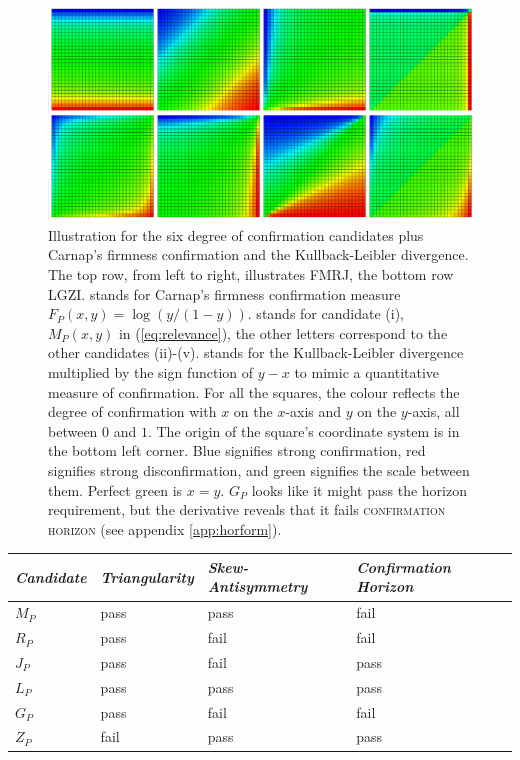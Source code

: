 \documentclass[phd,12pt,oneside]{ubcthesis}
\begin{document}
\begin{figure}[ht!]
    \begin{minipage}[h]{\linewidth}
      \includegraphics[width=\textwidth]{confirmation-FMRJLGZI.png}
      \caption{\footnotesize Illustration for the six degree of
        confirmation candidates plus Carnap's firmness confirmation
        and the Kullback-Leibler divergence. The top row, from left to
        right, illustrates FMRJ, the bottom row LGZI.  stands
        for Carnap's firmness confirmation measure
        $F_{P}(x,y)=\log(y/(1-y))$.  stands for candidate
        (i), $M_{P}(x,y)$ in (\ref{eq:relevance}), the other letters
        correspond to the other candidates (ii)-(v).  stands
        for the Kullback-Leibler divergence multiplied by the sign
        function of $y-x$ to mimic a quantitative measure of
        confirmation. For all the squares, the colour reflects the
        degree of confirmation with $x$ on the $x$-axis and $y$ on the
        $y$-axis, all between $0$ and $1$. The origin of the square's
        coordinate system is in the bottom left corner. Blue signifies
        strong confirmation, red signifies strong disconfirmation, and
        green signifies the scale between them. Perfect green is
        $x=y$. $G_{P}$ looks like it might pass the horizon
        requirement, but the derivative reveals that it fails
        \textsc{confirmation horizon} (see appendix
        \ref{app:horform}).}
      \label{fig:doconf}
\end{minipage}
\end{figure}

\begin{tabular}{|l|l|l|l|}\hline
  \emph{Candidate} & \emph{Triangularity} & \emph{Skew-Antisymmetry} & \emph{Confirmation Horizon} \\ \hline
  $M_{P}$ & pass & pass & fail \\ \hline
  $R_{P}$ & pass & fail & fail \\ \hline
  $J_{P}$ & pass & fail & pass \\ \hline
  $L_{P}$ & pass & pass & pass \\ \hline
  $G_{P}$ & pass & fail & fail \\ \hline
  $Z_{P}$ & fail & pass & pass \\ \hline
\end{tabular}
\end{document}
